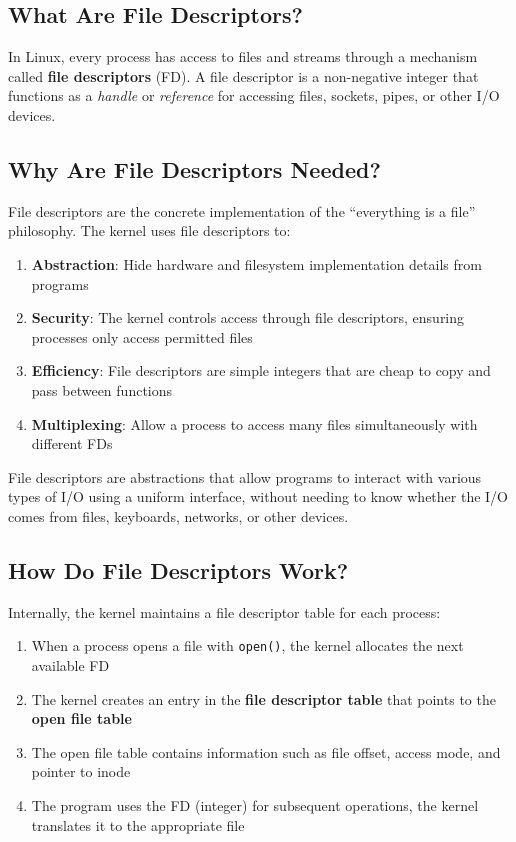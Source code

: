 \subsection{What Are File Descriptors?}

In Linux, every process has access to files and streams through a mechanism called \textbf{file descriptors} (FD). A file descriptor is a non-negative integer that functions as a \textit{handle} or \textit{reference} for accessing files, sockets, pipes, or other I/O devices.

\subsection{Why Are File Descriptors Needed?}

File descriptors are the concrete implementation of the ``everything is a file'' philosophy. The kernel uses file descriptors to:

\begin{enumerate}
	\item \textbf{Abstraction}: Hide hardware and filesystem implementation details from programs
	\item \textbf{Security}: The kernel controls access through file descriptors, ensuring processes only access permitted files
	\item \textbf{Efficiency}: File descriptors are simple integers that are cheap to copy and pass between functions
	\item \textbf{Multiplexing}: Allow a process to access many files simultaneously with different FDs
\end{enumerate}

\begin{notebox}
	File descriptors are abstractions that allow programs to interact with various types of I/O using a uniform interface, without needing to know whether the I/O comes from files, keyboards, networks, or other devices.
\end{notebox}

\subsection{How Do File Descriptors Work?}

Internally, the kernel maintains a file descriptor table for each process:

\begin{enumerate}
	\item When a process opens a file with \texttt{open()}, the kernel allocates the next available FD
	\item The kernel creates an entry in the \textbf{file descriptor table} that points to the \textbf{open file table}
	\item The open file table contains information such as file offset, access mode, and pointer to inode
	\item The program uses the FD (integer) for subsequent operations, the kernel translates it to the appropriate file
\end{enumerate}

